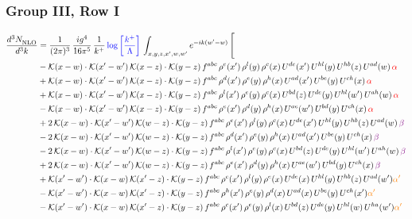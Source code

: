 \documentclass[9pt]{article}
\numberwithin{equation}{section}
\begin{document}
\subsubsection{Group III, Row I}
\begin{align}
     \frac{d^{3}N_{\rm NLO}^{\rm}}{d^{3}k}  & = \frac{1}{(2\pi)^{3}}\, \frac{ig^{4}}{16\pi^{5}}\, \frac{1}{k^{+}}\, {\color{blue}\log{\left[\frac{k^{+}}{\Lambda}\right]}}\, \int_{x,y,z,x^{\prime},w,w^{\prime}}e^{-ik(w^{\prime}-w)}\, \Bigg[\notag \\ & -\mathcal{K}(x-w)\cdot \mathcal{K}(x'-w')\, \mathcal{K}(x-z)\cdot \mathcal{K}(y-z)\, f^{abc}\, \rho^{e}(x')\,\rho^{l}(y)\,\rho^{c}(x)\,U^{de}(x')\,U^{hl}(y)\,U^{hb}(z)\,U^{ad}(w)\, {\color{red}\alpha} \notag \\ & +\mathcal{K}(x-w)\cdot \mathcal{K}(x'-w')\, \mathcal{K}(x-z)\cdot \mathcal{K}(y-z)\, f^{abc}\, \rho^{d}(x')\,\rho^{e}(y)\,\rho^{h}(x)\,U^{ad}(x')\,U^{be}(y)\,U^{ch}(x)\, {\color{red}\alpha} \notag \\ & + \mathcal{K}(x-w)\cdot \mathcal{K}(x'-w')\, \mathcal{K}(x-z)\cdot \mathcal{K}(y-z)\, f^{abc}\, \rho^{l}(x')\,\rho^{e}(y)\,\rho^{c}(x)\,U^{bd}(z)\,U^{de}(y)\,U^{hl}(w')\,U^{ah}(w)\, {\color{red}\alpha} \notag \\ & -\mathcal{K}(x-w)\cdot \mathcal{K}(x'-w')\, \mathcal{K}(x-z)\cdot \mathcal{K}(y-z)\, f^{abc}\, \rho^{e}(x')\,\rho^{d}(y)\,\rho^{h}(x)\,U^{ae}(w')\,U^{bd}(y)\,U^{ch}(x)\, {\color{red}\alpha} \notag \\ & +2\, \mathcal{K}(x-w)\cdot \mathcal{K}(x'-w')\, \mathcal{K}(w-z) \cdot \mathcal{K}(y-z)\, f^{abc}\, \rho^{e}(x')\,\rho^{l}(y)\, \rho^{c}(x)\, U^{de}(x')\,U^{hl}(y)\,U^{hb}(z)\,U^{ad}(w)\, {\color{violet} \beta} \notag \\ & -2\, \mathcal{K}(x-w)\cdot \mathcal{K}(x'-w')\, \mathcal{K}(w-z) \cdot \mathcal{K}(y-z)\, f^{abc}\, \rho^{d}(x')\,\rho^{e}(y)\, \rho^{h}(x)\, U^{ad}(x')\,U^{be}(y)\,U^{ch}(x)\, {\color{violet} \beta}\notag \\ & -2\, \mathcal{K}(x-w)\cdot \mathcal{K}(x'-w')\, \mathcal{K}(w-z) \cdot \mathcal{K}(y-z)\, f^{abc}\, \rho^{l}(x')\,\rho^{e}(y)\, \rho^{c}(x)\, U^{bd}(z)\,U^{de}(y)\,U^{hl}(w')\,U^{ah}(w)\, {\color{violet} \beta}\notag \\ & + 2\, \mathcal{K}(x-w)\cdot \mathcal{K}(x'-w')\, \mathcal{K}(w-z) \cdot \mathcal{K}(y-z)\, f^{abc}\, \rho^{e}(x')\,\rho^{d}(y)\, \rho^{h}(x)\, U^{ae}(w')\,U^{bd}(y)\,U^{ch}(x)\, {\color{violet} \beta}\notag \\ & +\mathcal{K}(x'-w')\cdot\mathcal{K}(x-w)\,\mathcal{K}(x'-z)\cdot\mathcal{K}(y-z)\, f^{abc}\,\rho^{c}(x')\,\rho^{l}(y)\,\rho^{e}(x)\,U^{de}(x)\,U^{hl}(y)\,U^{hb}(z)\,U^{ad}(w'){\color{orange} \alpha'}\notag\\ &-\mathcal{K}(x'-w')\cdot\mathcal{K}(x-w)\,\mathcal{K}(x'-z)\cdot\mathcal{K}(y-z)\, f^{abc}\,\rho^{h}(x')\,\rho^{e}(y)\,\rho^{d}(x)\,U^{ad}(x)\,U^{be}(y)\,U^{ch}(x'){\color{orange} \alpha'}\notag\\ &-\mathcal{K}(x'-w')\cdot\mathcal{K}(x-w)\,\mathcal{K}(x'-z)\cdot\mathcal{K}(y-z)\, f^{abc}\,\rho^{c}(x')\,\rho^{e}(y)\,\rho^{l}(x)\,U^{bd}(z)\,U^{de}(y)\,U^{hl}(w)\,U^{ha}(w'){\color{orange} \alpha'}\notag \\ 
\end{align}
\end{document}
